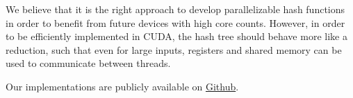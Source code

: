 \documentclass[letterpaper]{article}
\begin{document}
We believe that it is the right approach to develop parallelizable hash functions in order to benefit from future devices with high core counts.
However, in order to be efficiently implemented in CUDA, the hash tree should behave more like a reduction, such that even for large inputs, registers and shared memory can be used to communicate between threads.

Our implementations are publicly available on \href{ https://github.com/Walon1998/Fast-Hashing-in-CUDA}{Github}.




\end{document}
